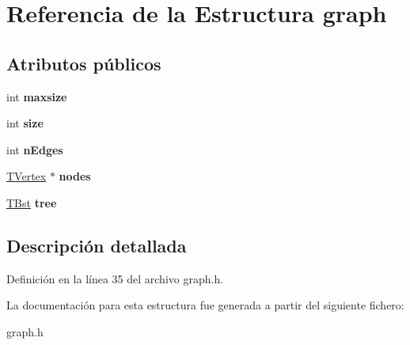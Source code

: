 \hypertarget{structgraph}{}\section{Referencia de la Estructura graph}
\label{structgraph}
\subsection*{Atributos públicos}
\begin{DoxyCompactItemize}
\item 
\mbox{\label{structgraph_a80c80a900e0a96dd9a3cae91c0810a69}} 
int {\bfseries maxsize}
\item 
\mbox{\label{structgraph_a1886eee83ecdda7ec0304c751f8177d9}} 
int {\bfseries size}
\item 
\mbox{\label{structgraph_a757e5043695ddd41169d3d3cf83fa14e}} 
int {\bfseries n\+Edges}
\item 
\mbox{\label{structgraph_a9710008cfa7ed669a88f4522c06770cc}} 
\hyperlink{structvertex}{T\+Vertex} $\ast$ {\bfseries nodes}
\item 
\mbox{\label{structgraph_a87383a8147bcae83b50a307ce381a793}} 
\hyperlink{structbinary_search_tree}{T\+Bst} {\bfseries tree}
\end{DoxyCompactItemize}


\subsection{Descripción detallada}


Definición en la línea 35 del archivo graph.\+h.



La documentación para esta estructura fue generada a partir del siguiente fichero\+:\begin{DoxyCompactItemize}
\item 
graph.\+h\end{DoxyCompactItemize}
